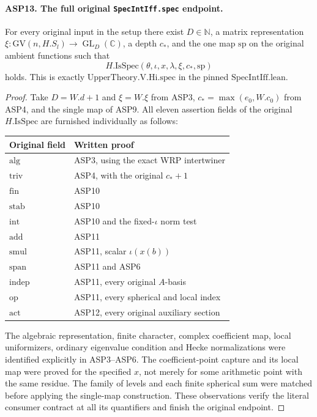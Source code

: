 \paragraph{ASP13. The full original \texttt{SpecIntIff.spec} endpoint.}
\label{claim:ASP13}
For every original input in the setup there
exist $D\in\mathbb N$, a matrix representation
$\xi:\mathrm{GV}(n,H.S_l)\to\operatorname{GL}_D(\mathbb C)$,
a depth $c_*$, and the one map $\mathrm{sp}$
on the original ambient functions such that
\[
          H.\mathrm{IsSpec}(\theta,\iota,x,\lambda,
                                                \xi,c_*,\mathrm{sp})
\]
holds.  This is exactly
$\mathrm{UpperTheory.V.Hi.spec}$ in the pinned
$\mathrm{SpecIntIff.lean}$.
\begin{proof}
Take $D=W.d+1$ and $\xi=W.\xi$ from ASP3,
$c_*=\max(e_0,W.c_0)$ from ASP4, and the
single map of ASP9.  All eleven assertion
fields of the original $H.\mathrm{IsSpec}$
are furnished individually as follows:
\begin{center}
\begin{tabular}{ll}
Original field & Written proof \\
\hline
$\mathrm{alg}$ & ASP3, using the exact WRP intertwiner \\
$\mathrm{triv}$ & ASP4, with the original $c_*+1$ \\
$\mathrm{fin}$ & ASP10 \\
$\mathrm{stab}$ & ASP10 \\
$\mathrm{int}$ & ASP10 and the fixed-$\iota$ norm test \\
$\mathrm{add}$ & ASP11 \\
$\mathrm{smul}$ & ASP11, scalar $\iota(x(b))$ \\
$\mathrm{span}$ & ASP11 and ASP6 \\
$\mathrm{indep}$ & ASP11, every original $A$-basis \\
$\mathrm{op}$ & ASP11, every spherical and local index \\
$\mathrm{act}$ & ASP12, every original auxiliary section
\end{tabular}
\end{center}
The algebraic representation, finite character,
complex coefficient map, local uniformizers,
ordinary eigenvalue condition and Hecke
normalizations were identified explicitly in
ASP3--ASP6.  The coefficient-point capture
and its local map were proved for the
specified $x$, not merely for some arithmetic
point with the same residue.  The family of
levels and each finite spherical sum were
matched before applying the single-map
construction.  These observations verify the
literal consumer contract at all its
quantifiers and finish the original endpoint.
\end{proof}

